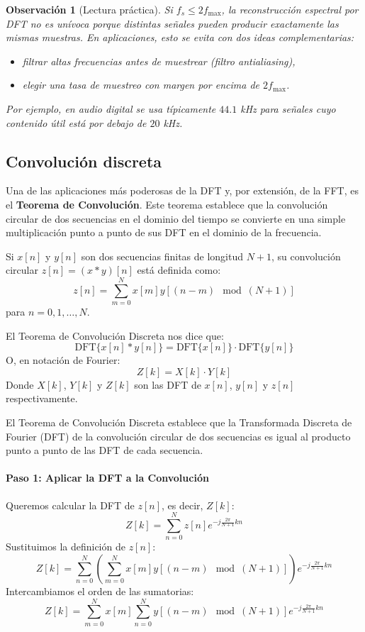 \documentclass[a4paper,11pt]{report}
\newtheorem{remark}[theorem]{Observación}
\begin{document}
\begin{remark}[Lectura práctica]
Si $f_s\le 2f_{\max}$, la reconstrucción espectral por DFT no es unívoca porque distintas señales pueden producir exactamente las mismas muestras. En aplicaciones, esto se evita con dos ideas complementarias:
\begin{itemize}
\item filtrar altas frecuencias antes de muestrear (filtro antialiasing),
\item elegir una tasa de muestreo con margen por encima de $2f_{\max}$.
\end{itemize}
Por ejemplo, en audio digital se usa típicamente $44.1$ kHz para señales cuyo contenido útil está por debajo de $20$ kHz.
\end{remark}

\subsection{Convolución discreta}
Una de las aplicaciones más poderosas de la DFT y, por extensión, de la FFT, es el \textbf{Teorema de Convolución}. Este teorema establece que la convolución circular de dos secuencias en el dominio del tiempo se convierte en una simple multiplicación punto a punto de sus DFT en el dominio de la frecuencia.

Si $x[n]$ y $y[n]$ son dos secuencias finitas de longitud $N+1$, su convolución circular $z[n] = (x * y)[n]$ está definida como:
$$z[n] = \sum_{m=0}^{N} x[m] y[(n-m) \mod (N+1)]$$
para $n = 0, 1, \dots, N$.

El Teorema de Convolución Discreta nos dice que:
$$\text{DFT}\{x[n] * y[n]\} = \text{DFT}\{x[n]\} \cdot \text{DFT}\{y[n]\}$$
O, en notación de Fourier:
$$Z[k] = X[k] \cdot Y[k]$$
Donde $X[k]$, $Y[k]$ y $Z[k]$ son las DFT de $x[n]$, $y[n]$ y $z[n]$ respectivamente.

El Teorema de Convolución Discreta establece que la Transformada Discreta de Fourier (DFT) de la convolución circular de dos secuencias es igual al producto punto a punto de las DFT de cada secuencia.

\paragraph{Paso 1: Aplicar la DFT a la Convolución}
Queremos calcular la DFT de $z[n]$, es decir, $Z[k]$:
$$Z[k] = \sum_{n=0}^{N} z[n] e^{-j \frac{2\pi}{N+1} kn}$$
Sustituimos la definición de $z[n]$:
$$Z[k] = \sum_{n=0}^{N} \left( \sum_{m=0}^{N} x[m] y[(n-m) \mod (N+1)] \right) e^{-j \frac{2\pi}{N+1} kn}$$
Intercambiamos el orden de las sumatorias:
$$Z[k] = \sum_{m=0}^{N} x[m] \sum_{n=0}^{N} y[(n-m) \mod (N+1)] e^{-j \frac{2\pi}{N+1} kn}$$
\end{document}

